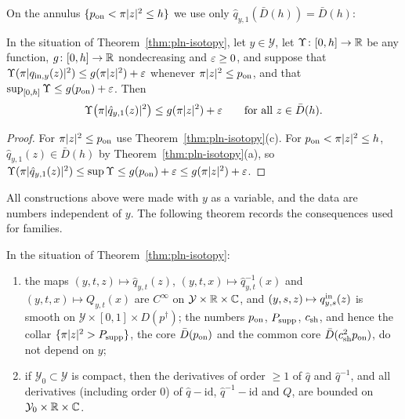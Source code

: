 On the annulus $\{p_{\rm on}<\pi|z|^2\le h\}$ we use only $\hat q_{y,1}(\bar D(h))=\bar D(h)$:

\begin{corollary}\label{thm:pln-full-disc}
In the situation of Theorem~\ref{thm:pln-isotopy}, let $y\in\mathcal Y$, let $\Upsilon\colon[0,h]\to\mathbb{R}$ be any function,
$g\colon[0,h]\to\mathbb{R}$ nondecreasing and $\varepsilon\ge0$, and suppose that $\Upsilon(\pi|q_{{\rm in},y}(z)|^2)\le g(\pi|z|^2)+\varepsilon$ whenever
$\pi|z|^2\le p_{\rm on}$, and that $\sup_{[0,h]}\Upsilon\le g(p_{\rm on})+\varepsilon$. Then
\[
 \Upsilon\bigl(\pi|\hat q_{y,1}(z)|^2\bigr)\le g(\pi|z|^2)+\varepsilon\qquad\text{for all }z\in\bar D(h).
\]
\end{corollary}

\begin{proof}
For $\pi|z|^2\le p_{\rm on}$ use Theorem~\ref{thm:pln-isotopy}(c). For $p_{\rm on}<\pi|z|^2\le h$, $\hat q_{y,1}(z)\in\bar D(h)$ by
Theorem~\ref{thm:pln-isotopy}(a), so $\Upsilon(\pi|\hat q_{y,1}(z)|^2)\le\sup\Upsilon\le g(p_{\rm on})+\varepsilon\le g(\pi|z|^2)+\varepsilon$.
\end{proof}

All constructions above were made with $y$ as a variable, and the data are numbers independent of $y$. The
following theorem records the consequences used for families.

\begin{theorem}\label{thm:pln-param}
In the situation of Theorem~\ref{thm:pln-isotopy}:
\begin{enumerate}[label=(\alph*)]
\item the maps $(y,t,z)\mapsto\hat q_{y,t}(z)$, $(y,t,x)\mapsto\hat q_{y,t}^{-1}(x)$ and $(y,t,x)\mapsto Q_{y,t}(x)$ are $C^\infty$ on
 $\mathcal Y\times\mathbb{R}\times\mathbb{C}$, and $(y,s,z)\mapsto q^{\rm in}_{y,s}(z)$ is smooth on $\mathcal Y\times[0,1]\times D(p^\dagger)$; the
 numbers $p_{\rm on}$, $P_{\rm supp}$, $c_{\rm sh}$, and hence the collar $\{\pi|z|^2>P_{\rm supp}\}$, the core $\bar D(p_{\rm on})$ and the
 common core $\bar D(c_{\rm sh}^2p_{\rm on})$, do not depend on $y$;
\item if $\mathcal Y_0\subset\mathcal Y$ is compact, then the derivatives of order $\ge1$ of $\hat q$ and $\hat q^{-1}$, and all
 derivatives (including order $0$) of $\hat q-\mathrm{id}$, $\hat q^{-1}-\mathrm{id}$ and $Q$, are bounded on
 $\mathcal Y_0\times\mathbb{R}\times\mathbb{C}$.
\end{enumerate}
\end{theorem}

